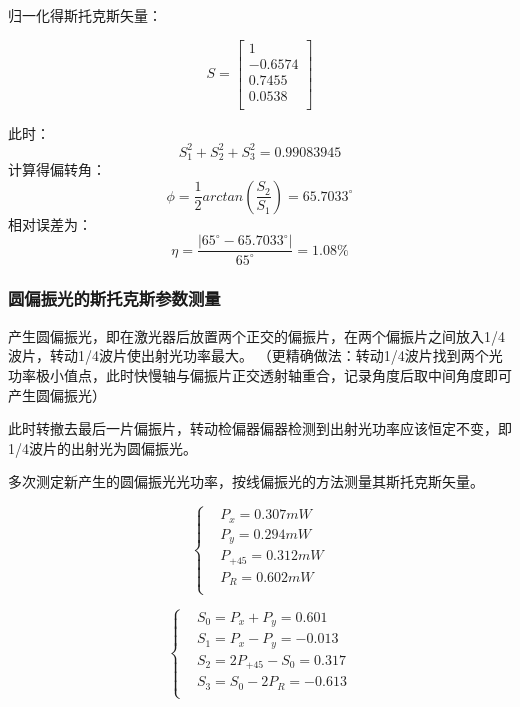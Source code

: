 \documentclass[10pt,a4paper,twoside,UTF8]{ctexart}
\begin{document}
归一化得斯托克斯矢量：

\begin{equation}
	S=
	\left[ 
		\begin{array}{c}
		1\\
		-0.6574\\
		0.7455\\
		0.0538\\
		\end{array} 
	\right ]
\end{equation}

此时：
\begin{equation*}
	S_1^2+S_2^2+S_3^2=0.99083945
\end{equation*}
计算得偏转角：
\begin{equation*}
	\phi=\frac{1}{2}arctan\left(\frac{S_2}{S_1}\right)=65.7033^{\circ}
\end{equation*}
相对误差为：
\begin{equation*}
	\eta=\frac{|65^{\circ}-65.7033^{\circ}|}{65^{\circ}}=1.08\%
\end{equation*}


\subsubsection{圆偏振光的斯托克斯参数测量}

产生圆偏振光，即在激光器后放置两个正交的偏振片，在两个偏振片之间放入1/4波片，转动1/4波片使出射光功率最大。
（更精确做法：转动1/4波片找到两个光功率极小值点，此时快慢轴与偏振片正交透射轴重合，记录角度后取中间角度即可产生圆偏振光）

此时转撤去最后一片偏振片，转动检偏器偏器检测到出射光功率应该恒定不变，即1/4波片的出射光为圆偏振光。

多次测定新产生的圆偏振光光功率，按线偏振光的方法测量其斯托克斯矢量。

\[\left\{
\begin{aligned}
&P_x=0.307mW\\
&P_y=0.294mW\\
&P_{+45}=0.312mW\\
&P_R=0.602mW\\
\end{aligned}
\right.
\]

\[\left\{
\begin{aligned}
&S_0=P_x+P_y=0.601\\
&S_1=P_x-P_y=-0.013\\
&S_2=2P_{+45}-S_0=0.317\\
&S_3=S_0-2P_R=-0.613\\
\end{aligned}
\right.
\]
\end{document}
